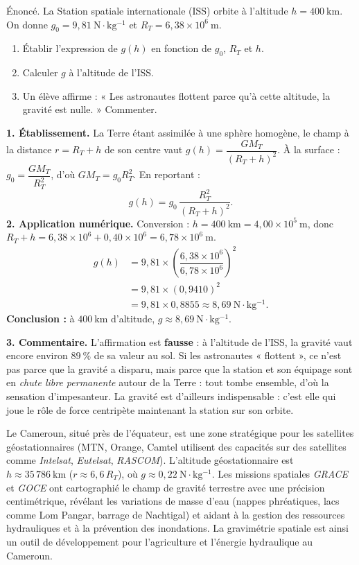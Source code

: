 \documentclass[11pt]{article}
\begin{document}
\begin{exoresolu}
Énoncé. La Station spatiale internationale (ISS) orbite à l'altitude $h = 400\ \mathrm{km}$. On donne $g_0 = 9{,}81\ \mathrm{N\cdot kg^{-1}}$ et $R_T = 6{,}38\times 10^{6}\ \mathrm{m}$.
\begin{enumerate}
\item Établir l'expression de $g(h)$ en fonction de $g_0$, $R_T$ et $h$.
\item Calculer $g$ à l'altitude de l'ISS.
\item Un élève affirme : « Les astronautes flottent parce qu'à cette altitude, la gravité est nulle. » Commenter.
\end{enumerate}
\tcblower
\textbf{1. Établissement.} La Terre étant assimilée à une sphère homogène, le champ à la distance $r = R_T + h$ de son centre vaut $g(h) = \dfrac{GM_T}{(R_T+h)^2}$. À la surface : $g_0 = \dfrac{GM_T}{R_T^2}$, d'où $GM_T = g_0 R_T^2$. En reportant :
\[ g(h) = g_0\,\dfrac{R_T^2}{(R_T+h)^2}. \]
\textbf{2. Application numérique.} Conversion : $h = 400\ \mathrm{km} = 4{,}00\times 10^{5}\ \mathrm{m}$, donc $R_T + h = 6{,}38\times 10^{6} + 0{,}40\times 10^{6} = 6{,}78\times 10^{6}\ \mathrm{m}$.
\begin{align*}
g(h) &= 9{,}81\times \left(\dfrac{6{,}38\times 10^{6}}{6{,}78\times 10^{6}}\right)^2 \\
&= 9{,}81\times (0{,}9410)^2 \\
&= 9{,}81\times 0{,}8855 \approx 8{,}69\ \mathrm{N\cdot kg^{-1}}.
\end{align*}
\textbf{Conclusion :} à $400\ \mathrm{km}$ d'altitude, $g \approx 8{,}69\ \mathrm{N\cdot kg^{-1}}$.

\textbf{3. Commentaire.} L'affirmation est \textbf{fausse} : à l'altitude de l'ISS, la gravité vaut encore environ $89\ \%$ de sa valeur au sol. Si les astronautes « flottent », ce n'est pas parce que la gravité a disparu, mais parce que la station et son équipage sont en \emph{chute libre permanente} autour de la Terre : tout tombe ensemble, d'où la sensation d'impesanteur. La gravité est d'ailleurs indispensable : c'est elle qui joue le rôle de force centripète maintenant la station sur son orbite.
\end{exoresolu}

\begin{savaistu}
Le Cameroun, situé près de l'équateur, est une zone stratégique pour les satellites géostationnaires (MTN, Orange, Camtel utilisent des capacités sur des satellites comme \emph{Intelsat}, \emph{Eutelsat}, \emph{RASCOM}). L'altitude géostationnaire est $h \approx 35\,786\ \mathrm{km}$ ($r \approx 6,6\,R_T$), où $g \approx 0,22\ \mathrm{N\cdot kg^{-1}}$.
Les missions spatiales \emph{GRACE} et \emph{GOCE} ont cartographié le champ de gravité terrestre avec une précision centimétrique, révélant les variations de masse d'eau (nappes phréatiques, lacs comme Lom Pangar, barrage de Nachtigal) et aidant à la gestion des ressources hydrauliques et à la prévention des inondations. La gravimétrie spatiale est ainsi un outil de développement pour l'agriculture et l'énergie hydraulique au Cameroun.
\end{savaistu}
\end{document}
